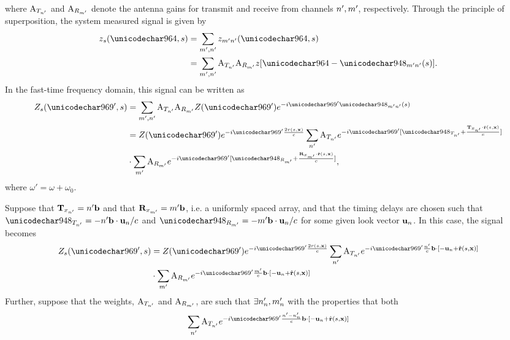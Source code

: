 where $\text{A}_{T_{n'}}$ and $\text{A}_{R_{m'}}$ denote the antenna gains for transmit and receive from channels $n',m'$, respectively.
Through the principle of superposition, the system measured signal is given by
\begin{equation}
\begin{split}
\pulse_{s}(\fasttime, \parm) &= \sum_{\txm,\txn}\pulse_{\txm\txn}(\fasttime, \parm)\\
&=\sum_{\txm,\txn}\txAmp{\txn}\rxAmp{\txm}\pulse[\fasttime - \mnDelay(\parm)].
\end{split}
\end{equation}
In the fast-time frequency domain, this signal can be written as
\begin{equation}
\begin{split}
\Pulse_{s}(\omega', \parm)&=\sum_{\txm,\txn}\txAmp{\txn}\rxAmp{\txm}\Pulse(\omega')\eex{-\im\omega'\mnDelay(\parm)}\\
&=\Pulse(\omega')\eex{-\im\omega'\frac{2\amplitude\range(\parm, \targetnoparm)}{c}}\sum_{\txn}\txAmp{\txn}\eex{-\im\omega'[\txDelay{\txn}+\frac{\anTx{\txn}\cdot\uRangeVectorParm}{c}]}\\
&\cdot\sum_{\txm}\rxAmp{\txm}\eex{-\im\omega'[\rxDelay{\txm}+\frac{\anRx{\txm}\cdot\uRangeVectorParm}{c}]},
\end{split}
\end{equation}
where $\omega'=\omega+\omega_0$.
\par
Suppose that $\mathbf{T}_{x_{n'}} = n'\mathbf{b}$ and that $\mathbf{R}_{x_{m'}} = m'\mathbf{b}$, i.e. a uniformly spaced array, and that the timing delays are chosen such that $\txDelay{\txn} = -\txn\bline\cdot\uzero/c$ and $\rxDelay{\txm} = -\txm\bline\cdot\uzero/c$ for some given look vector $\mathbf{u}_{n}$. In this case, the signal becomes
 \begin{equation}
 \begin{split}
  \Pulse_{s}(\omega', \parm)&=\Pulse(\omega')\eex{-\im\omega'\frac{2\amplitude\range(\parm, \targetnoparm)}{c}}\sum_{\txn}\txAmp{\txn}\eex{-\im\omega'\frac{\txn}{c}\bline\cdot[-\uzero+\uRangeVectorParm]}\\
  &\cdot\sum_{\txm}\rxAmp{\txm}\eex{-\im\omega'\frac{\txm}{c}\bline\cdot[-\uzero+\uRangeVectorParm]}
 \end{split}
 \end{equation}
Further, suppose that the weights, $\text{A}_{T_{n'}}$ and $\text{A}_{R_{m'}}$, are such that $\exists n'_{n}, m'_{n}$ with the properties that both
 \begin{equation}
  \sum_{\txn}\txAmp{\txn}\eex{-\im\omega'\frac{\txn-\txn_\channelIndex}{c}\bline\cdot[-\uzero+\uRangeVectorParm]}
 \end{equation}
